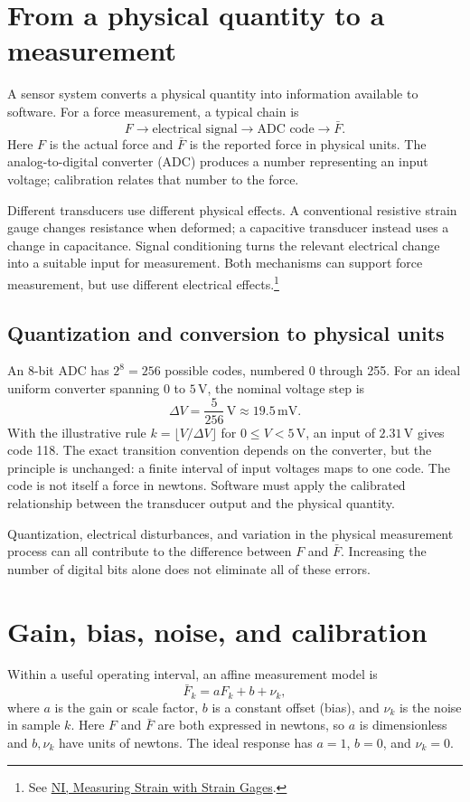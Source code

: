 \section{From a physical quantity to a measurement}
A sensor system converts a physical quantity into information available to
software. For a force measurement, a typical chain is
\[
 F\longrightarrow\text{electrical signal}\longrightarrow
 \text{ADC code}\longrightarrow\bar F.
\]
Here $F$ is the actual force and $\bar F$ is the reported force in physical
units. The analog-to-digital converter (ADC) produces a number representing
an input voltage; calibration relates that number to the force.

Different transducers use different physical effects. A conventional
resistive strain gauge changes resistance when deformed; a capacitive
transducer instead uses a change in capacitance. Signal conditioning turns
the relevant electrical change into a suitable input for measurement.
Both mechanisms can support force measurement, but use different electrical
effects.\footnote{See
\href{https://www.ni.com/en/shop/data-acquisition/sensor-fundamentals/measuring-strain-with-strain-gages.html}{NI, Measuring Strain with Strain Gages}.}

\subsection{Quantization and conversion to physical units}
An 8-bit ADC has $2^8=256$ possible codes, numbered 0 through 255.
For an ideal uniform converter spanning 0 to $5\,\mathrm V$, the nominal
voltage step is
\[
 \Delta V=\frac{5}{256}\,\mathrm V\approx19.5\,\mathrm{mV}.
\]
With the illustrative rule $k=\lfloor V/\Delta V\rfloor$ for
$0\le V<5\,\mathrm V$, an input of $2.31\,\mathrm V$ gives code 118.
The exact transition convention depends on the converter, but the principle
is unchanged: a finite interval of input voltages maps to one code.
The code is not itself a force in newtons. Software must apply the calibrated
relationship between the transducer output and the physical quantity.

Quantization, electrical disturbances, and variation in the physical
measurement process can all contribute to the difference between $F$ and
$\bar F$. Increasing the number of digital bits alone does not eliminate
all of these errors.

\section{Gain, bias, noise, and calibration}
Within a useful operating interval, an affine measurement model is
\begin{equation}
 \bar F_k=aF_k+b+\nu_k,
 \label{eq:l06-noise}
\end{equation}
where $a$ is the gain or scale factor, $b$ is a constant offset (bias), and
$\nu_k$ is the noise in sample $k$. Here $F$ and $\bar F$ are both expressed
in newtons, so $a$ is dimensionless and $b,\nu_k$ have units of newtons.
The ideal response has $a=1$, $b=0$, and $\nu_k=0$.

